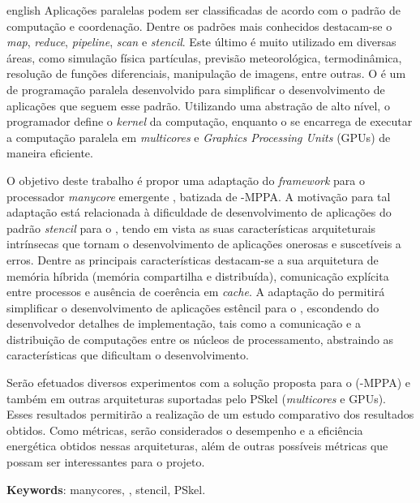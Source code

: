 \begin{resumo}[Abstract]
 \begin{otherlanguage*}{english}
Aplicações paralelas podem ser classificadas de acordo com o padrão de computação e coordenação. Dentre os padrões mais conhecidos destacam-se o \textit{map}, \textit{reduce}, \textit{pipeline}, \textit{scan} e \textit{stencil}. Este último é muito utilizado em diversas áreas, como simulação física partículas, previsão meteorológica, termodinâmica, resolução de funções diferenciais, manipulação de imagens, entre outras. O \pskel é um \fw de programação paralela desenvolvido para simplificar o desenvolvimento de aplicações que seguem esse padrão. Utilizando uma abstração de alto nível, o programador define o \emph{kernel} da computação, enquanto o \fw se encarrega de executar a computação paralela em \textit{multicores} e \textit{Graphics Processing Units} (GPUs) de maneira eficiente. 

O objetivo deste trabalho é propor uma adaptação do \textit{framework} \pskel para o processador \textit{manycore} emergente \mppa, batizada de \pskel-MPPA. A motivação para tal adaptação está relacionada à dificuldade de desenvolvimento de aplicações do padrão \textit{stencil} para o \mppa, tendo em vista as suas características arquiteturais intrínsecas que tornam o desenvolvimento de aplicações onerosas e suscetíveis a erros. Dentre as principais características destacam-se a sua arquitetura de memória híbrida (memória compartilha e distribuída), comunicação explícita entre processos e ausência de coerência em \textit{cache}. A adaptação do \fw permitirá simplificar o desenvolvimento de aplicações estêncil para o \mppa, escondendo do desenvolvedor detalhes de implementação, tais como a comunicação e a distribuição de computações entre os núcleos de processamento, abstraindo as características que dificultam o desenvolvimento. 

Serão efetuados diversos experimentos com a solução proposta para o \mppa (\pskel-MPPA) e também em outras arquiteturas suportadas pelo PSkel (\textit{multicores} e GPUs). Esses resultados permitirão a realização de um estudo comparativo dos resultados obtidos. Como métricas, serão considerados o desempenho e a eficiência energética obtidos nessas arquiteturas, além de outras possíveis métricas que possam ser interessantes para o projeto.   \vspace{\onelineskip}
 
   \noindent 
   \textbf{Keywords}: manycores, \mppa, stencil, PSkel.
 \end{otherlanguage*}
\end{resumo}

